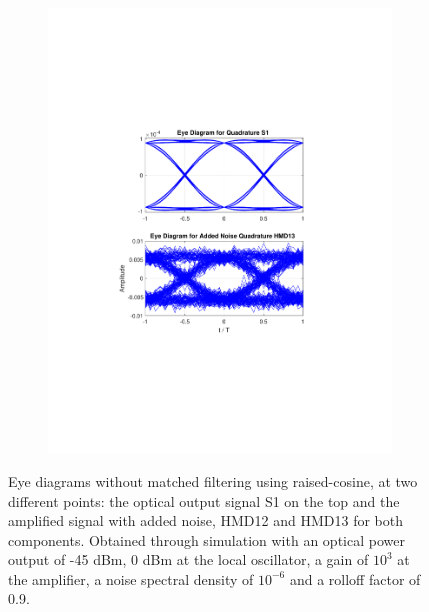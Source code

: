 \begin{figure}[H]
\begin{subfigure}{.45\textwidth}
		\includegraphics[clip, trim=5cm 4cm 5cm 4cm, width=\textwidth]{./sdf/m_qam_system/figures/eyes/q_n_nmf_45_60_rc_09.pdf}
	\end{subfigure}
	
	\caption{Eye diagrams without matched filtering using raised-cosine, at
		two different points: the optical output signal S1 on the top and the amplified
		signal with added noise, HMD12 and HMD13 for both components.
		Obtained through simulation with an optical power output of
		-45 dBm, 0 dBm at the local oscillator, a gain of $10^3$ at the amplifier, a
		noise spectral density of $10^{-6}$ and a rolloff factor of
		0.9.\label{fig:eyes_n_rc_45_09}}
\end{figure}

